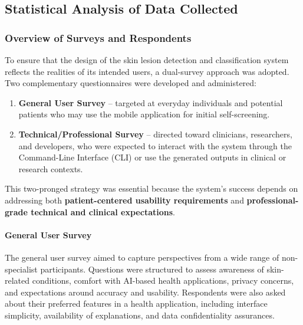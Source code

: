 \documentclass[
  12pt,
  oneside]{article}
\providecommand{\tightlist}{%
  \setlength{\itemsep}{0pt}\setlength{\parskip}{0pt}}
\begin{document}
\subsection{Statistical Analysis of Data
Collected}\label{statistical-analysis-of-data-collected}

\subsubsection{Overview of Surveys and
Respondents}\label{overview-of-surveys-and-respondents}

To ensure that the design of the skin lesion detection and
classification system reflects the realities of its intended users, a
dual-survey approach was adopted. Two complementary questionnaires were
developed and administered:

\begin{enumerate}
\def\labelenumi{\arabic{enumi}.}
\tightlist
\item
  \textbf{General User Survey} -- targeted at everyday individuals and
  potential patients who may use the mobile application for initial
  self-screening.\\
\item
  \textbf{Technical/Professional Survey} -- directed toward clinicians,
  researchers, and developers, who were expected to interact with the
  system through the Command-Line Interface (CLI) or use the generated
  outputs in clinical or research contexts.
\end{enumerate}

This two-pronged strategy was essential because the system's success
depends on addressing both \textbf{patient-centered usability
requirements} and \textbf{professional-grade technical and clinical
expectations}.

\paragraph{General User Survey}\label{general-user-survey}

The general user survey aimed to capture perspectives from a wide range
of non-specialist participants. Questions were structured to assess
awareness of skin-related conditions, comfort with AI-based health
applications, privacy concerns, and expectations around accuracy and
usability. Respondents were also asked about their preferred features in
a health application, including interface simplicity, availability of
explanations, and data confidentiality assurances.
\end{document}
